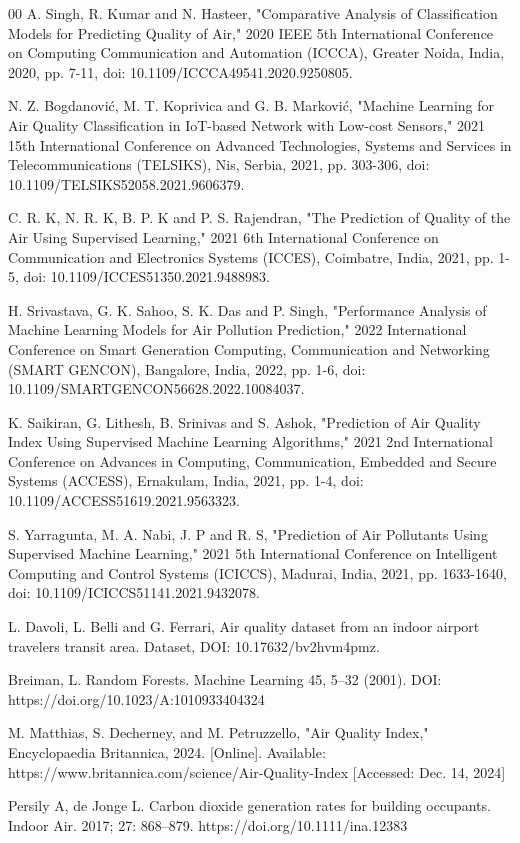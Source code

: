 \documentclass[conference]{IEEEtran}
\begin{document}
\begin{thebibliography}{00}
 A. Singh, R. Kumar and N. Hasteer, "Comparative Analysis of Classification Models for Predicting Quality of Air," 2020 IEEE 5th International Conference on Computing Communication and Automation (ICCCA), Greater Noida, India, 2020, pp. 7-11, doi: 10.1109/ICCCA49541.2020.9250805.

 N. Z. Bogdanović, M. T. Koprivica and G. B. Marković, "Machine Learning for Air Quality Classification in IoT-based Network with Low-cost Sensors," 2021 15th International Conference on Advanced Technologies, Systems and Services in Telecommunications (TELSIKS), Nis, Serbia, 2021, pp. 303-306, doi: 10.1109/TELSIKS52058.2021.9606379.

C. R. K, N. R. K, B. P. K and P. S. Rajendran, "The Prediction of Quality of the Air Using Supervised Learning," 2021 6th International Conference on Communication and Electronics Systems (ICCES), Coimbatre, India, 2021, pp. 1-5, doi: 10.1109/ICCES51350.2021.9488983.

H. Srivastava, G. K. Sahoo, S. K. Das and P. Singh, "Performance Analysis of Machine Learning Models for Air Pollution Prediction," 2022 International Conference on Smart Generation Computing, Communication and Networking (SMART GENCON), Bangalore, India, 2022, pp. 1-6, doi: 10.1109/SMARTGENCON56628.2022.10084037.

K. Saikiran, G. Lithesh, B. Srinivas and S. Ashok, "Prediction of Air Quality Index Using Supervised Machine Learning Algorithms," 2021 2nd International Conference on Advances in Computing, Communication, Embedded and Secure Systems (ACCESS), Ernakulam, India, 2021, pp. 1-4, doi: 10.1109/ACCESS51619.2021.9563323.

S. Yarragunta, M. A. Nabi, J. P and R. S, "Prediction of Air Pollutants Using Supervised Machine Learning," 2021 5th International Conference on Intelligent Computing and Control Systems (ICICCS), Madurai, India, 2021, pp. 1633-1640, doi: 10.1109/ICICCS51141.2021.9432078.

 L. Davoli, L. Belli  and G. Ferrari, Air quality dataset from an indoor airport travelers transit area. Dataset,  DOI: 10.17632/bv2hvm4pmz.


 Breiman, L. Random Forests. Machine Learning 45, 5–32 (2001). DOI: https://doi.org/10.1023/A:1010933404324

 M. Matthias, S. Decherney, and M. Petruzzello, "Air Quality Index," Encyclopaedia Britannica, 2024. [Online]. Available: https://www.britannica.com/science/Air-Quality-Index [Accessed: Dec. 14, 2024]

Persily A, de Jonge L. Carbon dioxide generation rates for building occupants. Indoor Air. 2017; 27: 868–879. https://doi.org/10.1111/ina.12383
\end{thebibliography}
\end{document}
